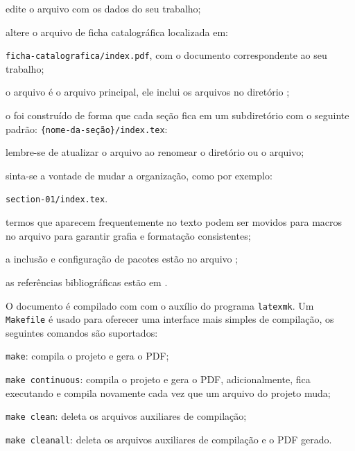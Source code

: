 \begin{alineas}
	\item edite o arquivo  \metadatafile com os dados do seu trabalho;

	\item altere o arquivo de ficha catalográfica localizada em:

	\contentdir{}\texttt{ficha-catalografica/index.pdf}, com o documento correspondente ao seu trabalho;

	\item o arquivo \mainfile é o arquivo principal, ele inclui os arquivos no diretório \contentdir;

	\item o \template foi construído de forma que cada seção fica em um subdiretório com o seguinte padrão: \contentdir{}\texttt{\{nome-da-seção\}/index.tex}:

	\begin{alineas}
		\item lembre-se de atualizar o arquivo \mainfile ao renomear o diretório ou o arquivo;
			
		\item sinta-se a vontade de mudar a organização, como por exemplo:

		\contentdir{}\texttt{section-01/index.tex}.
	\end{alineas}
		
	\item termos que aparecem frequentemente no texto podem ser movidos para macros no arquivo \macrofile para garantir grafia e formatação consistentes;

	\item a inclusão e configuração de pacotes estão no arquivo \pkgfile;

	\item as referências bibliográficas estão em \bibfile.
\end{alineas}

O documento é compilado com \XeLaTeX{} com o auxílio do programa \texttt{latexmk}. Um \texttt{Makefile} é usado para oferecer uma interface mais simples de compilação, os seguintes comandos são suportados:

\begin{alineas}
	\item \texttt{make}: compila o projeto e gera o PDF;

	\item \texttt{make continuous}: compila o projeto e gera o PDF, adicionalmente, fica executando e compila novamente cada vez que um arquivo do projeto muda;

	\item \texttt{make clean}: deleta os arquivos auxiliares de compilação;

	\item \texttt{make cleanall}: deleta os arquivos auxiliares de compilação e o PDF gerado.
\end{alineas}

